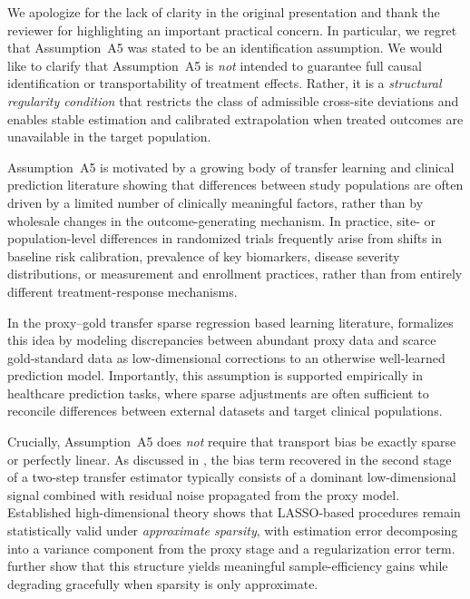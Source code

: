{\color{blue}
We apologize for the lack of clarity in the original presentation and thank the reviewer for highlighting an important practical concern. In particular, we regret that Assumption~A5 was stated to be an identification assumption. 
We would like to clarify that Assumption~A5 is \emph{not} intended to guarantee full causal identification or transportability of treatment effects. 
Rather, it is a \emph{structural regularity condition} that restricts the class of admissible cross-site deviations and enables stable estimation and calibrated extrapolation when treated outcomes are unavailable in the target population.

Assumption~A5 is motivated by a growing body of transfer learning and clinical prediction literature showing that differences between study populations are often driven by a limited number of clinically meaningful factors, rather than by wholesale changes in the outcome-generating mechanism. In practice, site- or population-level differences in randomized trials frequently arise from shifts in baseline risk calibration, prevalence of key biomarkers, disease severity distributions, or measurement and enrollment practices, rather than from entirely different treatment-response mechanisms.

In the proxy--gold transfer sparse regression based learning literature, \cite{bastani2021predicting} formalizes this idea by modeling discrepancies between abundant proxy data and scarce gold-standard data as low-dimensional corrections to an otherwise well-learned prediction model. Importantly, this assumption is supported empirically in healthcare prediction tasks, where sparse adjustments are often sufficient to reconcile differences between external datasets and target clinical populations.

Crucially, Assumption~A5 does \emph{not} require that transport bias be exactly sparse or perfectly linear.
As discussed in \cite{bastani2021predicting}, the bias term recovered in the second stage of a two-step transfer estimator typically consists of a dominant low-dimensional signal combined with residual noise propagated from the proxy model. Established high-dimensional theory shows that LASSO-based procedures remain statistically valid under \emph{approximate sparsity}, with estimation error decomposing into a variance component from the proxy stage and a regularization error term. \cite{buhlmann2011statistics, belloni2012sparse, bastani2021predicting} further show that this structure yields meaningful sample-efficiency gains while degrading gracefully when sparsity is only approximate.

}
